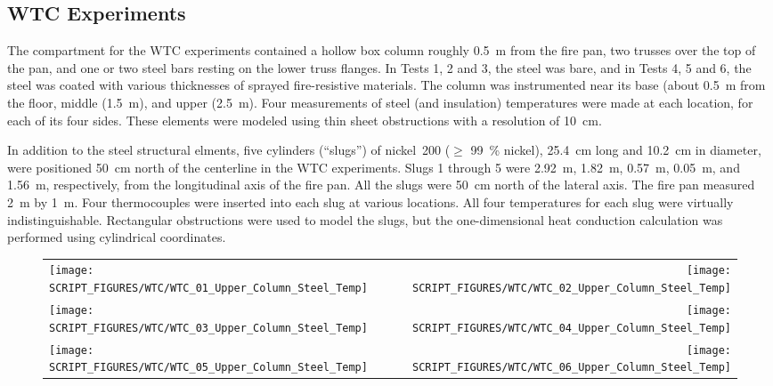 \clearpage

\subsection{WTC Experiments}

The compartment for the WTC experiments contained a hollow box column roughly 0.5~m from the fire pan, two trusses over the top of the pan, and one or two steel bars resting on the lower truss flanges. In Tests 1, 2 and 3, the steel was bare, and in Tests 4, 5 and 6, the steel was coated with various thicknesses of sprayed fire-resistive materials. The column was instrumented near its base (about 0.5~m from the floor, middle (1.5~m), and upper (2.5~m). Four measurements of steel (and insulation) temperatures were made at each location, for each of its four sides. These elements were modeled using thin sheet obstructions with a resolution of 10~cm.

In addition to the steel structural elments, five cylinders (``slugs'') of nickel~200 ($\ge$ 99~\% nickel), 25.4~cm long and 10.2~cm in diameter, were positioned 50~cm north of the centerline in the WTC experiments. Slugs 1 through 5 were 2.92~m, 1.82~m, 0.57~m, 0.05~m, and 1.56~m, respectively, from the longitudinal axis of the fire pan. All the slugs were 50~cm north of the lateral axis. The fire pan measured 2~m by 1~m. Four thermocouples were inserted into each slug at various locations. All four temperatures for each slug were virtually indistinguishable. Rectangular obstructions were used to model the slugs, but the one-dimensional heat conduction calculation was performed using cylindrical coordinates.

\newpage

\begin{figure}[p]
\begin{tabular*}{\textwidth}{l@{\extracolsep{\fill}}r}
\texttt{[image: SCRIPT\_FIGURES/WTC/WTC\_01\_Upper\_Column\_Steel\_Temp]} &
\texttt{[image: SCRIPT\_FIGURES/WTC/WTC\_02\_Upper\_Column\_Steel\_Temp]} \\
\texttt{[image: SCRIPT\_FIGURES/WTC/WTC\_03\_Upper\_Column\_Steel\_Temp]} &
\texttt{[image: SCRIPT\_FIGURES/WTC/WTC\_04\_Upper\_Column\_Steel\_Temp]} \\
\texttt{[image: SCRIPT\_FIGURES/WTC/WTC\_05\_Upper\_Column\_Steel\_Temp]} &
\texttt{[image: SCRIPT\_FIGURES/WTC/WTC\_06\_Upper\_Column\_Steel\_Temp]}
\end{tabular*}
\label{NIST_WTC_Upper_Column_Steel}
\end{figure}

